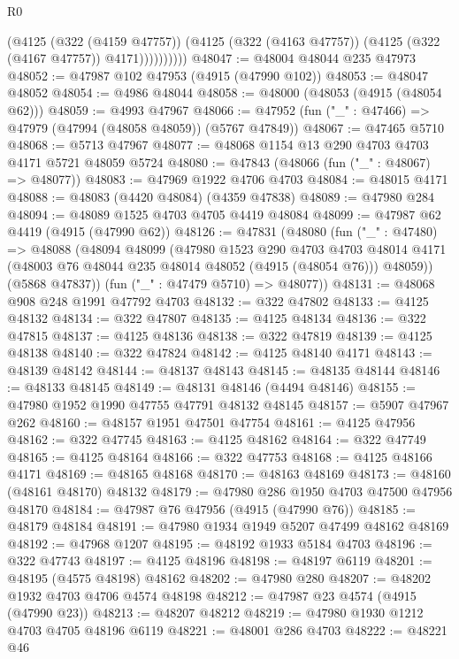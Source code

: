 \begin{lexlean}{R0}
\begin{coremodule}
                  (@4125
                    (@322 (@4159 @47757))
                    (@4125 (@322 (@4163 @47757)) (@4125 (@322 (@4167 @47757)) @4171))))))))))
@48047 := @48004 @48044 @235 @47973
@48052 := @47987 @102 @47953 (@4915 (@47990 @102))
@48053 := @48047 @48052
@48054 := @4986 @48044
@48058 := @48000 (@48053 (@4915 (@48054 @62)))
@48059 := @4993 @47967
@48066 := @47952 (fun ("_" : @47466) => @47979 (@47994 (@48058 @48059)) (@5767 @47849))
@48067 := @47465 @5710
@48068 := @5713 @47967
@48077 := @48068 @1154 @13 @290 @4703 @4703 @4171 @5721 @48059 @5724
@48080 := @47843 (@48066 (fun ("_" : @48067) => @48077))
@48083 := @47969 @1922 @4706 @4703
@48084 := @48015 @4171
@48088 := @48083 (@4420 @48084) (@4359 @47838)
@48089 := @47980 @284
@48094 := @48089 @1525 @4703 @4705 @4419 @48084
@48099 := @47987 @62 @4419 (@4915 (@47990 @62))
@48126 := @47831
    (@48080
      (fun ("_" : @47480) =>
      @48088
        (@48094
          @48099
          (@47980
            @1523
            @290
            @4703
            @4703
            @48014
            @4171
            (@48003 @76 @48044 @235 @48014 @48052 (@4915 (@48054 @76)))
            @48059))
        (@5868 @47837))
      (fun ("_" : @47479 @5710) => @48077))
@48131 := @48068 @908 @248 @1991 @47792 @4703
@48132 := @322 @47802
@48133 := @4125 @48132
@48134 := @322 @47807
@48135 := @4125 @48134
@48136 := @322 @47815
@48137 := @4125 @48136
@48138 := @322 @47819
@48139 := @4125 @48138
@48140 := @322 @47824
@48142 := @4125 @48140 @4171
@48143 := @48139 @48142
@48144 := @48137 @48143
@48145 := @48135 @48144
@48146 := @48133 @48145
@48149 := @48131 @48146 (@4494 @48146)
@48155 := @47980 @1952 @1990 @47755 @47791 @48132 @48145
@48157 := @5907 @47967 @262
@48160 := @48157 @1951 @47501 @47754
@48161 := @4125 @47956
@48162 := @322 @47745
@48163 := @4125 @48162
@48164 := @322 @47749
@48165 := @4125 @48164
@48166 := @322 @47753
@48168 := @4125 @48166 @4171
@48169 := @48165 @48168
@48170 := @48163 @48169
@48173 := @48160 (@48161 @48170) @48132
@48179 := @47980 @286 @1950 @4703 @47500 @47956 @48170
@48184 := @47987 @76 @47956 (@4915 (@47990 @76))
@48185 := @48179 @48184
@48191 := @47980 @1934 @1949 @5207 @47499 @48162 @48169
@48192 := @47968 @1207
@48195 := @48192 @1933 @5184 @4703
@48196 := @322 @47743
@48197 := @4125 @48196
@48198 := @48197 @6119
@48201 := @48195 (@4575 @48198) @48162
@48202 := @47980 @280
@48207 := @48202 @1932 @4703 @4706 @4574 @48198
@48212 := @47987 @23 @4574 (@4915 (@47990 @23))
@48213 := @48207 @48212
@48219 := @47980 @1930 @1212 @4703 @4705 @48196 @6119
@48221 := @48001 @286 @4703
@48222 := @48221 @46

\end{coremodule}
\end{lexlean}

